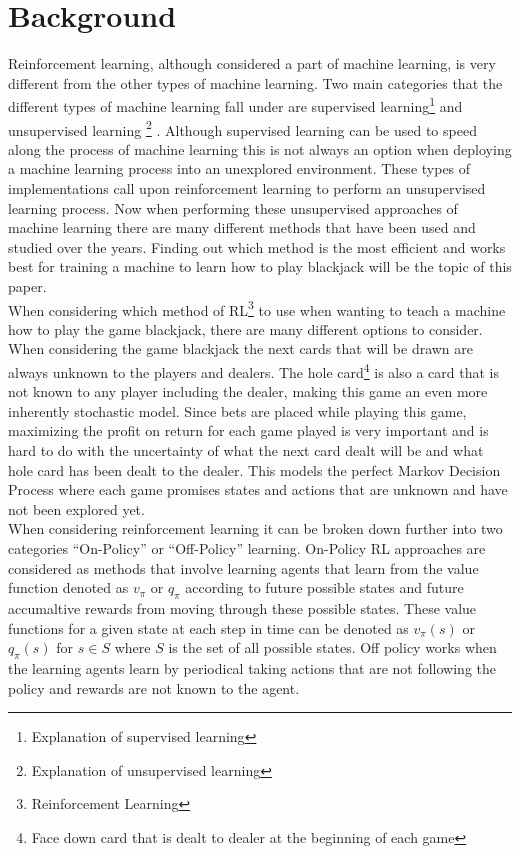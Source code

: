 \documentclass[twoside,twocolumn]{article}
\begin{document}

\section{Background}

Reinforcement learning, although considered a part of machine learning, is very different from the other types of machine learning.  Two main categories that the different types of machine learning fall under are supervised learning\footnote{Explanation of supervised learning} and unsupervised learning \footnote{Explanation of unsupervised learning} \cite{sutton:2018}.  Although supervised learning can be used to speed along the process of machine learning this is not always an option when deploying a machine learning process into an unexplored environment.  These types of implementations call upon reinforcement learning to perform an unsupervised learning process.  Now when performing these unsupervised approaches of machine learning there are many different methods that have been used and studied over the years.  Finding out which method is the most efficient and works best for training a machine to learn how to play blackjack will be the topic of this paper.\\ 

\indent When considering which method of RL\footnote{Reinforcement Learning} to use when wanting to teach a machine how to play the game blackjack, there are many different options to consider.  When considering the game blackjack the next cards that will be drawn are always unknown to the players and dealers.  The hole card\footnote{Face down card that is dealt to dealer at the beginning of each game} is also a card that is not known to any player including the dealer, making this game an even more inherently stochastic model.  Since bets are placed while playing this game, maximizing the profit on return for each game played is very important and is hard to do with the uncertainty of what the next card dealt will be and what hole card has been dealt to the dealer.  This models the perfect Markov Decision Process where each game promises states and actions that are unknown and have not been explored yet.\\

\indent When considering reinforcement learning it can be broken down further into two categories “On-Policy” or “Off-Policy” learning.  On-Policy RL approaches are considered as methods that involve learning agents that learn from the value function denoted as $v_{\pi}$ or $q_{\pi}$ according to future possible states and future accumaltive rewards from moving through these possible states.  These value functions for a given state at each step in time can be denoted as $v_{\pi}(s)$  or $q_{\pi}(s)$ for $s \in S$ where $S$ is the set of all possible states.   
\indent Off policy works when the learning agents learn by periodical taking actions that are not following the policy and rewards are not known to the agent.
\end{document}

